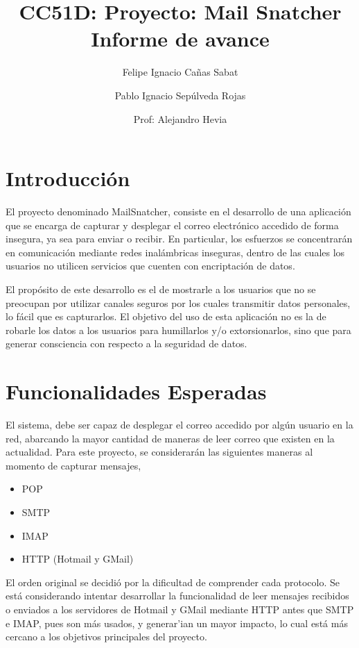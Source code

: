 \documentclass[titlepage]{article}
\title{CC51D: Proyecto: Mail Snatcher \\Informe de avance}
\author{Felipe Ignacio Ca\~nas Sabat \and Pablo Ignacio Sep\'ulveda Rojas
\and Prof: Alejandro Hevia}
\begin{document}
\maketitle
\section{Introducci\'on}

El proyecto denominado MailSnatcher, consiste en el desarrollo de una
aplicación que se encarga de capturar y desplegar el correo electr\'onico
accedido de forma insegura, ya sea para enviar o recibir. En particular, los
esfuerzos se concentrar\'an en comunicaci\'on mediante redes inal\'ambricas
inseguras, dentro de las cuales los usuarios no utilicen servicios que cuenten
con encriptaci\'on de datos.

El prop\'osito de este desarrollo es el de mostrarle a los usuarios que no se
preocupan por utilizar canales seguros por los cuales transmitir datos
personales, lo f\'acil que es capturarlos. El objetivo del uso de esta
aplicación no es la de robarle los datos a los usuarios para humillarlos y/o
extorsionarlos, sino que para generar consciencia con respecto a la seguridad
de datos.

\section{Funcionalidades Esperadas}

El sistema, debe ser capaz de desplegar el correo accedido por alg\'un usuario
en la red, abarcando la mayor cantidad de maneras de leer correo que existen
en la actualidad. Para este proyecto, se considerar\'an las siguientes maneras
al momento de capturar mensajes,

\begin{itemize}
\item POP
\item SMTP
\item IMAP
\item HTTP (Hotmail y GMail)
\end{itemize} 

El orden original se decidi\'o por la dificultad de comprender cada protocolo.
Se est\'a considerando intentar desarrollar la funcionalidad de leer mensajes
recibidos o enviados a los servidores de Hotmail y GMail mediante HTTP antes
que SMTP e IMAP, pues son m\'as usados, y generar'ian un mayor impacto, lo
cual está más cercano a los objetivos principales del proyecto.
\end{document}
